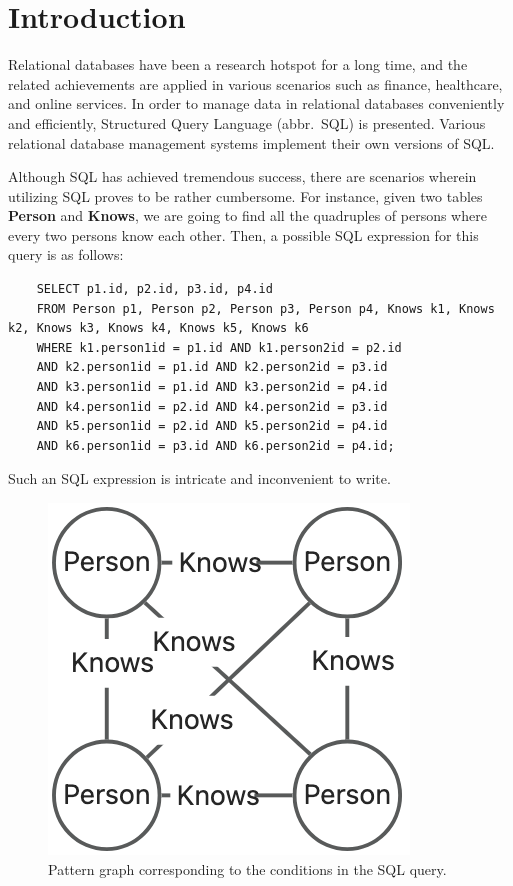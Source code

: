 \section{Introduction}

Relational databases have been a research hotspot for a long time, and the related achievements are applied in various scenarios such as finance, healthcare, and online services.
In order to manage data in relational databases conveniently and efficiently, Structured Query Language (abbr.~SQL) is presented.
Various relational database management systems implement their own versions of SQL.

Although SQL has achieved tremendous success, there are scenarios wherein utilizing SQL proves to be rather cumbersome.
For instance, given two tables \textbf{Person} and \textbf{Knows}, we are going to find all the quadruples of persons where every two persons know each other.
Then, a possible SQL expression for this query is as follows:
\begin{lstlisting}
    SELECT p1.id, p2.id, p3.id, p4.id
    FROM Person p1, Person p2, Person p3, Person p4, Knows k1, Knows k2, Knows k3, Knows k4, Knows k5, Knows k6
    WHERE k1.person1id = p1.id AND k1.person2id = p2.id
    AND k2.person1id = p1.id AND k2.person2id = p3.id
    AND k3.person1id = p1.id AND k3.person2id = p4.id
    AND k4.person1id = p2.id AND k4.person2id = p3.id
    AND k5.person1id = p2.id AND k5.person2id = p4.id
    AND k6.person1id = p3.id AND k6.person2id = p4.id;
\end{lstlisting}
Such an SQL expression is intricate and inconvenient to write.


\begin{figure}
    \centering
    \includegraphics[width=.3\linewidth]{./figures/intro-pattern.png}
    \caption{Pattern graph corresponding to the conditions in the SQL query.}
    \label{fig:intro-pattern}
\end{figure}


